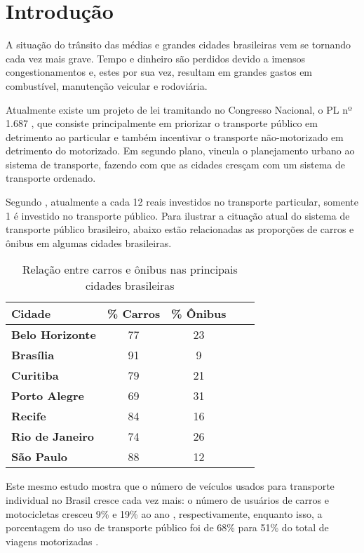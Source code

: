 \chapter{Introdução}
A situação do trânsito das médias e grandes cidades brasileiras vem se tornando cada vez mais grave.
Tempo e dinheiro são perdidos devido a imensos congestionamentos e, estes por sua vez, resultam em grandes gastos em combustível, manutenção veicular e rodoviária.

Atualmente existe um projeto de lei tramitando no Congresso Nacional, o PL nº 1.687 \cite{FlexaRibeiro2010}, que consiste principalmente em priorizar o transporte público em detrimento ao particular e também incentivar o transporte não-motorizado em detrimento do motorizado.
Em segundo plano, vincula o planejamento urbano ao sistema de transporte, fazendo com que as cidades cresçam com um sistema de transporte ordenado.

Segundo \cite{IPEA2011}, atualmente a cada 12 reais investidos no transporte particular, somente 1 é investido no transporte público.
Para ilustrar a cituação atual do sistema de transporte público brasileiro, abaixo estão relacionadas as proporções de carros e ônibus em algumas cidades brasileiras.

\begin{table}[!htb]
	\centering
	\caption{Relação entre carros e ônibus nas principais cidades brasileiras}
	\label{tab:carro_onibus}
	\begin{tabular}{lcccc}
		\hline
		\textbf{Cidade} & \textbf{\% Carros} & \textbf{\% Ônibus} \\
		\hline
		\textbf{Belo Horizonte} & 77 & 23 \\
		\textbf{Brasília} & 91 & 9 \\
		\textbf{Curitiba} & 79 & 21 \\
		\textbf{Porto Alegre} & 69 & 31 \\
		\textbf{Recife} & 84 & 16 \\
		\textbf{Rio de Janeiro} & 74 & 26 \\
		\textbf{São Paulo} & 88 & 12 \\
		\hline
	\end{tabular}
\end{table}

Este mesmo estudo mostra que o número de veículos usados para transporte individual no Brasil cresce cada vez mais: o número de usuários de carros e motocicletas cresceu 9\% e 19\% ao ano , respectivamente, enquanto isso, a porcentagem do uso de transporte público foi de 68\% para 51\% do total de viagens motorizadas \cite{IPEA2011}.


